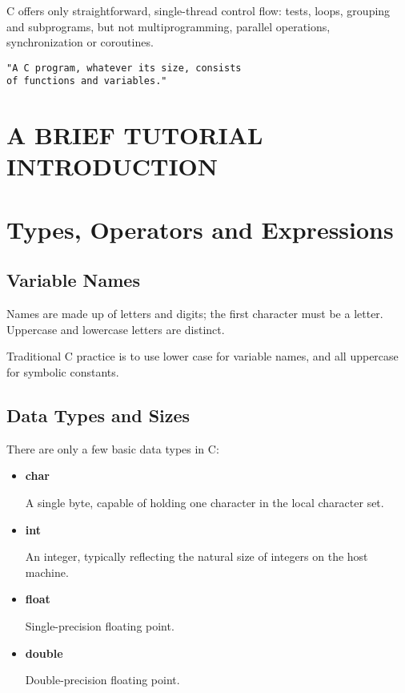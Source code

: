 \documentclass{article}
\begin{document}
C offers only straightforward, single-thread control flow: tests, loops, grouping and subprograms, but not multiprogramming, parallel operations, synchronization or coroutines.

\clearpage
\begin{verbatim}
"A C program, whatever its size, consists
of functions and variables."
\end{verbatim}

\clearpage
\section{A BRIEF TUTORIAL INTRODUCTION}




\clearpage
\section{Types, Operators and Expressions}

\subsection{Variable Names}

\medskip Names are made up of letters and digits; the first character must be a letter.
Uppercase and lowercase letters are distinct. 

Traditional C practice is to use lower case for variable names, and all uppercase for symbolic constants.

\subsection{Data Types and Sizes}

There are only a few basic data types in C:

\begin{itemize}

\item \textbf{char}

	A single byte, capable of holding one character in the local character set.

\item \textbf{int}

	An integer, typically reflecting the natural size of integers on the host machine.

\item \textbf{float}

	Single-precision floating point.

\item \textbf{double}

	Double-precision floating point.
\end{itemize}
\end{document}
